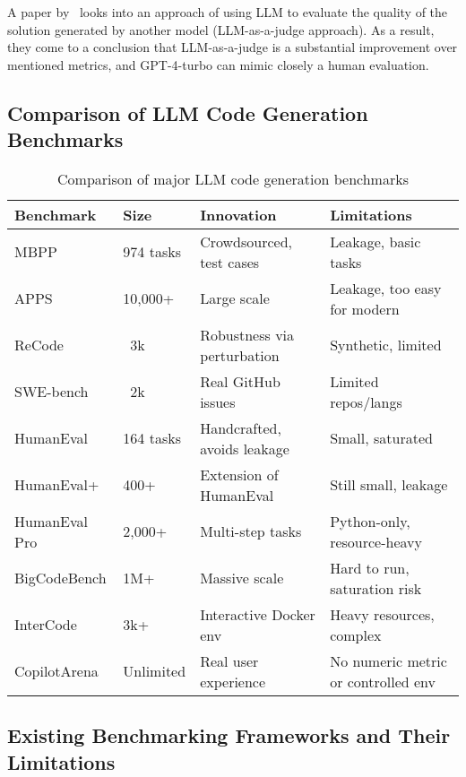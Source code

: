 A paper by~\cite{crupi2025effectiveness} looks into an approach of using LLM to evaluate the quality of the solution generated by another model (LLM-as-a-judge approach).
As a result, they come to a conclusion that LLM-as-a-judge is a substantial improvement over mentioned metrics, and GPT-4-turbo can mimic closely a human evaluation.

\subsection{Comparison of LLM Code Generation Benchmarks}

\begin{table}[h!]
    \centering
    \begin{tabular}{|l|l|p{5.3cm}|p{5.3cm}|}
        \hline
        \textbf{Benchmark} & \textbf{Size} & \textbf{Innovation} & \textbf{Limitations} \\
        \hline
        MBPP & 974 tasks & Crowdsourced, test cases & Leakage, basic tasks \\
        \hline
        APPS & 10,000+ & Large scale & Leakage, too easy for modern \\
        \hline
        ReCode & ~3k & Robustness via perturbation & Synthetic, limited \\
        \hline
        SWE-bench & ~2k & Real GitHub issues & Limited repos/langs \\
        \hline
        HumanEval & 164 tasks & Handcrafted, avoids leakage & Small, saturated \\
        \hline
        HumanEval+ & 400+ & Extension of HumanEval & Still small, leakage \\
        \hline
        HumanEval Pro & 2,000+ & Multi-step tasks & Python-only, resource-heavy \\
        \hline
        BigCodeBench & 1M+ & Massive scale & Hard to run, saturation risk \\
        \hline
        InterCode & 3k+  & Interactive Docker env & Heavy resources, complex \\
        \hline
        CopilotArena & Unlimited & Real user experience & No numeric metric or controlled env \\
        \hline
    \end{tabular}
    \caption{Comparison of major LLM code generation benchmarks}\label{tab:bench-compare-table}
\end{table}



\subsection{Existing Benchmarking Frameworks and Their Limitations}

